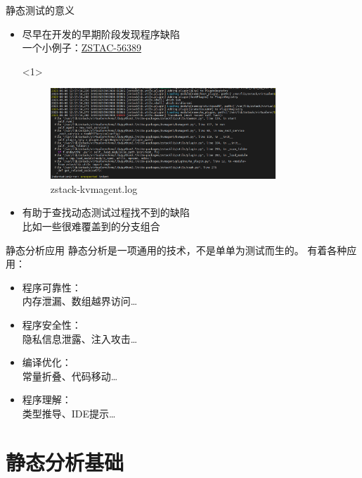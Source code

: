 \documentclass{beamer}
\begin{document}
\begin{frame}{静态测试的意义}
    \begin{itemize}
        \item<1-> 尽早在开发的早期阶段发现程序缺陷\\
        一个小例子：\href{http://jira.zstack.io/browse/ZSTAC-56389}{ZSTAC-56389}
        \begin{onlyenv}<1>
            \begin{figure}
                \centering
                \includegraphics[width=0.8\textwidth]{ZSTAC-56389.png}
                \caption{zstack-kvmagent.log}
            \end{figure}
        \end{onlyenv}
        \item<2-> 有助于查找动态测试过程找不到的缺陷\\
        比如一些很难覆盖到的分支组合
    \end{itemize}
\end{frame}

\begin{frame}{静态分析应用}
    静态分析是一项通用的技术，不是单单为测试而生的。
    有着各种应用：

    \begin{itemize}
        \item 程序可靠性：\\
        {\kaishu 内存泄漏、数组越界访问\ldots}
        \item 程序安全性：\\
        {\kaishu 隐私信息泄露、注入攻击\ldots}
        \item 编译优化：\\
        {\kaishu 常量折叠、代码移动\ldots}
        \item 程序理解：\\
        {\kaishu 类型推导、IDE提示\ldots}
    \end{itemize}
\end{frame}

\section{静态分析基础}
\end{document}
